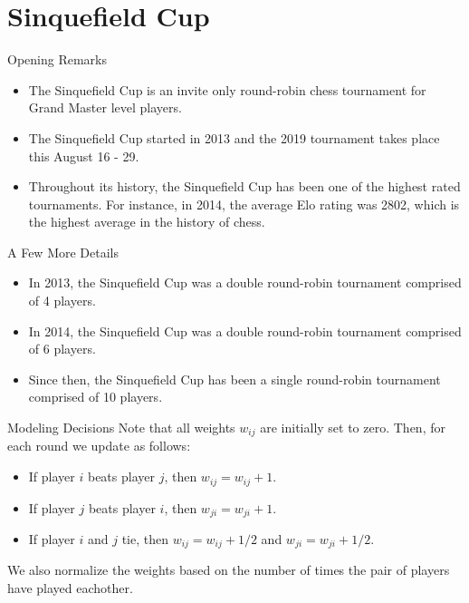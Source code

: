 \documentclass{beamer}
\begin{document}
\section{Sinquefield Cup}

\begin{frame}{Opening Remarks}
\begin{itemize}
\item	The Sinquefield Cup is an invite only round-robin chess tournament for Grand Master level players.
\vfill
\item	The Sinquefield Cup started in 2013 and the 2019 tournament takes place this August 16 - 29.
\vfill
\item	Throughout its history, the Sinquefield Cup has been one of the highest rated tournaments.
	For instance, in 2014, the average Elo rating was 2802, which is the highest average in the history of chess. 
\end{itemize}
\end{frame}

\begin{frame}{A Few More Details}
\begin{itemize}
\item	In 2013, the Sinquefield Cup was a double round-robin tournament comprised of 4 players.
\vfill
\item	In 2014, the Sinquefield Cup was a double round-robin tournament comprised of 6 players.
\vfill
\item	Since then, the Sinquefield Cup has been a single round-robin tournament comprised of 10 players. 
\end{itemize}
\end{frame}

\begin{frame}{Modeling Decisions}
Note that all weights $w_{ij}$ are initially set to zero.
Then, for each round we update as follows:
\vfill
\begin{itemize}
\item	If player $i$ beats player $j$, then $w_{ij}=w_{ij}+1$.
\vfill
\item	If player $j$ beats player $i$, then $w_{ji}=w_{ji}+1$.
\vfill
\item	If player $i$ and $j$ tie, then $w_{ij}=w_{ij}+1/2$ and $w_{ji}=w_{ji}+1/2$. 
\end{itemize}
\vfill
We also normalize the weights based on the number of times the pair of players have played eachother.
\end{frame}
\end{document}
